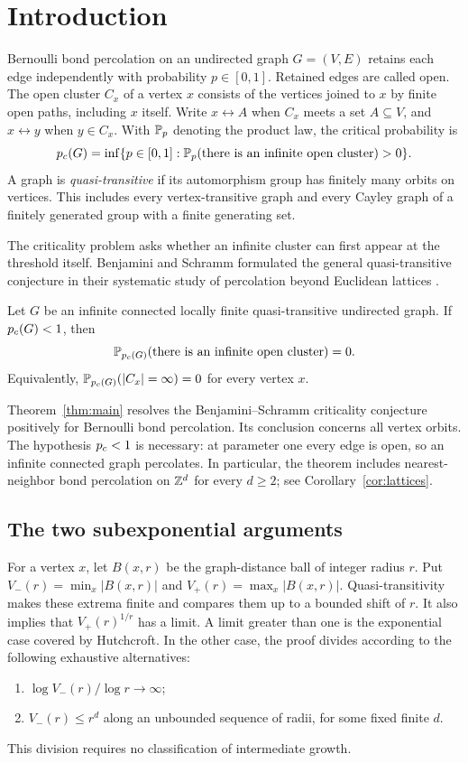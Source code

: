 \section{Introduction}
\label{sec:introduction}

Bernoulli bond percolation on an undirected graph $G=(V,E)$ retains
each edge independently with probability $p\in[0,1]$. Retained edges
are called open. The open cluster $C_x$ of a vertex $x$ consists of the
vertices joined to $x$ by finite open paths, including $x$ itself. Write
$x\leftrightarrow A$ when $C_x$ meets a set $A\subseteq V$, and
$x\leftrightarrow y$ when $y\in C_x$. With $\mathbb P_p$ denoting the product
law, the critical probability is
\[
 p_c(G)=\inf\{p\in[0,1]:
       \mathbb P_p(\text{there is an infinite open cluster})>0\}.
\]
A graph is \emph{quasi-transitive} if its automorphism group has finitely
many orbits on vertices. This includes every vertex-transitive graph
and every Cayley graph of a finitely generated group with a finite
generating set.

The criticality problem asks whether an infinite cluster can first
appear at the threshold itself. Benjamini and Schramm formulated the
general quasi-transitive conjecture in their systematic study of
percolation beyond Euclidean lattices
\cite[Conjecture~4]{BenjaminiSchramm1996}.

\begin{theorem}
\label{thm:main}
Let $G$ be an infinite connected locally finite quasi-transitive
undirected graph. If $p_c(G)<1$, then
\[
 \mathbb P_{p_c(G)}(\text{there is an infinite open cluster})=0.
\]
Equivalently, $\mathbb P_{p_c(G)}(|C_x|=\infty)=0$ for every vertex $x$.
\end{theorem}

Theorem~\ref{thm:main} resolves the Benjamini--Schramm criticality
conjecture positively for Bernoulli bond percolation. Its conclusion
concerns all vertex orbits.
The hypothesis $p_c<1$ is necessary: at parameter one every edge is
open, so an infinite connected graph percolates.
In particular, the theorem includes nearest-neighbor bond percolation on
$\mathbb Z^d$ for every $d\ge2$; see Corollary~\ref{cor:lattices}.

\subsection{The two subexponential arguments}

For a vertex $x$, let $B(x,r)$ be the graph-distance ball of integer
radius $r$. Put $V_-(r)=\min_x|B(x,r)|$ and
$V_+(r)=\max_x|B(x,r)|$. Quasi-transitivity makes these extrema finite
and compares them up to a bounded shift of $r$. It also implies that
$V_+(r)^{1/r}$ has a limit. A limit greater than one is the exponential
case covered by Hutchcroft. In the other case, the proof divides
according to the following exhaustive alternatives:
\begin{enumerate}[label=(\roman*)]
\item $\log V_-(r)/\log r\to\infty$;
\item $V_-(r)\le r^d$ along an unbounded sequence of radii, for some
fixed finite $d$.
\end{enumerate}
This division requires no classification of intermediate growth.

